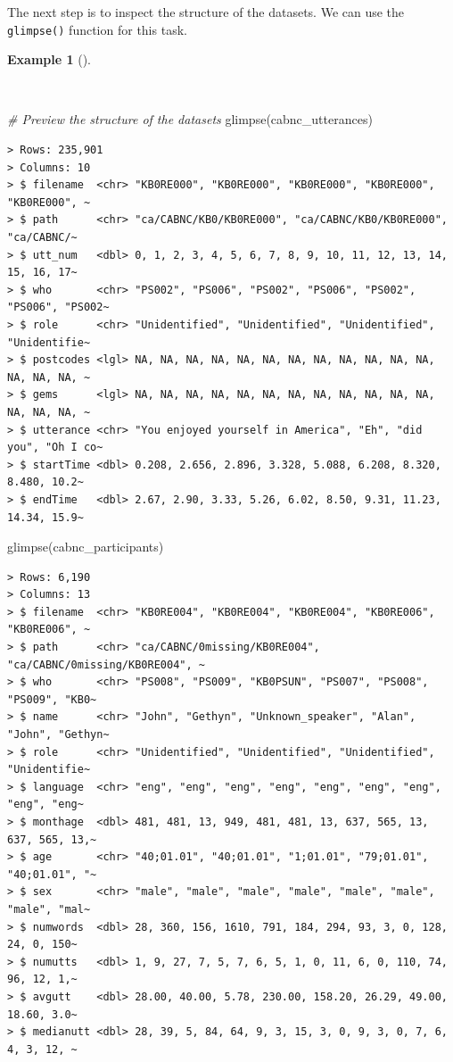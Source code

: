 \documentclass[
  letterpaper,
  DIV=11,
  numbers=noendperiod]{scrreport}
\newenvironment{Shaded}{\begin{snugshade}}{\end{snugshade}}
\newcommand{\CommentTok}[1]{\textcolor[rgb]{0.00,0.00,0.00}{\textit{#1}}}
\newcommand{\FunctionTok}[1]{\textcolor[rgb]{0.00,0.00,0.00}{#1}}
\newcommand{\NormalTok}[1]{\textcolor[rgb]{0.00,0.00,0.00}{#1}}
\theoremstyle{definition}
\newtheorem{example}{Example}[chapter]
\theoremstyle{remark}
\begin{document}
The next step is to inspect the structure of the datasets. We can use
the \texttt{glimpse()} function for this task.

\begin{example}[]\protect\hypertarget{exm-cd-cabnc-glimpse}{}\label{exm-cd-cabnc-glimpse}

~

\begin{Shaded}
\begin{Highlighting}[]
\CommentTok{\# Preview the structure of the datasets}
\FunctionTok{glimpse}\NormalTok{(cabnc\_utterances)}
\end{Highlighting}
\end{Shaded}

\begin{verbatim}
> Rows: 235,901
> Columns: 10
> $ filename  <chr> "KB0RE000", "KB0RE000", "KB0RE000", "KB0RE000", "KB0RE000", ~
> $ path      <chr> "ca/CABNC/KB0/KB0RE000", "ca/CABNC/KB0/KB0RE000", "ca/CABNC/~
> $ utt_num   <dbl> 0, 1, 2, 3, 4, 5, 6, 7, 8, 9, 10, 11, 12, 13, 14, 15, 16, 17~
> $ who       <chr> "PS002", "PS006", "PS002", "PS006", "PS002", "PS006", "PS002~
> $ role      <chr> "Unidentified", "Unidentified", "Unidentified", "Unidentifie~
> $ postcodes <lgl> NA, NA, NA, NA, NA, NA, NA, NA, NA, NA, NA, NA, NA, NA, NA, ~
> $ gems      <lgl> NA, NA, NA, NA, NA, NA, NA, NA, NA, NA, NA, NA, NA, NA, NA, ~
> $ utterance <chr> "You enjoyed yourself in America", "Eh", "did you", "Oh I co~
> $ startTime <dbl> 0.208, 2.656, 2.896, 3.328, 5.088, 6.208, 8.320, 8.480, 10.2~
> $ endTime   <dbl> 2.67, 2.90, 3.33, 5.26, 6.02, 8.50, 9.31, 11.23, 14.34, 15.9~
\end{verbatim}

\begin{Shaded}
\begin{Highlighting}[]
\FunctionTok{glimpse}\NormalTok{(cabnc\_participants)}
\end{Highlighting}
\end{Shaded}

\begin{verbatim}
> Rows: 6,190
> Columns: 13
> $ filename  <chr> "KB0RE004", "KB0RE004", "KB0RE004", "KB0RE006", "KB0RE006", ~
> $ path      <chr> "ca/CABNC/0missing/KB0RE004", "ca/CABNC/0missing/KB0RE004", ~
> $ who       <chr> "PS008", "PS009", "KB0PSUN", "PS007", "PS008", "PS009", "KB0~
> $ name      <chr> "John", "Gethyn", "Unknown_speaker", "Alan", "John", "Gethyn~
> $ role      <chr> "Unidentified", "Unidentified", "Unidentified", "Unidentifie~
> $ language  <chr> "eng", "eng", "eng", "eng", "eng", "eng", "eng", "eng", "eng~
> $ monthage  <dbl> 481, 481, 13, 949, 481, 481, 13, 637, 565, 13, 637, 565, 13,~
> $ age       <chr> "40;01.01", "40;01.01", "1;01.01", "79;01.01", "40;01.01", "~
> $ sex       <chr> "male", "male", "male", "male", "male", "male", "male", "mal~
> $ numwords  <dbl> 28, 360, 156, 1610, 791, 184, 294, 93, 3, 0, 128, 24, 0, 150~
> $ numutts   <dbl> 1, 9, 27, 7, 5, 7, 6, 5, 1, 0, 11, 6, 0, 110, 74, 96, 12, 1,~
> $ avgutt    <dbl> 28.00, 40.00, 5.78, 230.00, 158.20, 26.29, 49.00, 18.60, 3.0~
> $ medianutt <dbl> 28, 39, 5, 84, 64, 9, 3, 15, 3, 0, 9, 3, 0, 7, 6, 4, 3, 12, ~
\end{verbatim}


\end{example}
\end{document}
